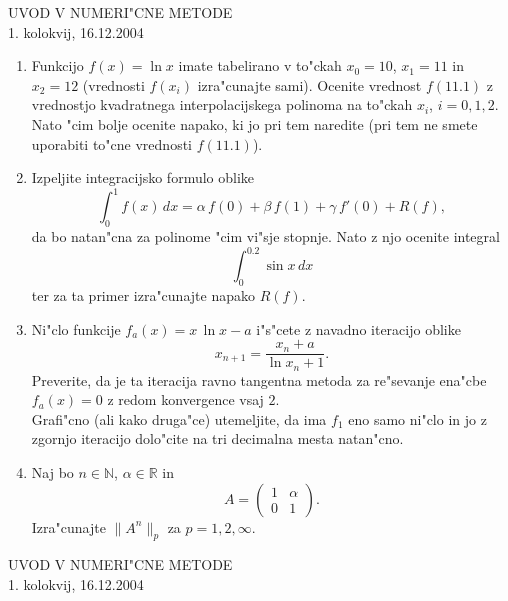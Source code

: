 \documentclass[12pt,a4paper]{article}
\def\RR{\mathbb{R}}
\def\NN{\mathbb{N}}
\begin{document}
\begin{center}
  {\large UVOD V NUMERI"CNE METODE\\
    1. kolokvij, 16.12.2004\\
    }
\end{center}
\vspace{2cm}

\begin{enumerate}

  \item Funkcijo $f(x)=\ln{x}$ imate tabelirano v 
    to"ckah $x_0=10$, $x_1=11$ in $x_2=12$ (vrednosti 
    $f(x_i)$ izra"cunajte sami). Ocenite vrednost $f(11.1)$
    z vrednostjo kvadratnega interpolacijskega polinoma 
    na to"ckah $x_i$, $i=0,1,2$. Nato "cim bolje ocenite napako, ki jo
    pri tem naredite (pri tem ne smete uporabiti to"cne
    vrednosti $f(11.1)$).
    
  \item Izpeljite integracijsko formulo oblike
    $$\int_{0}^1 f(x)\,dx=\alpha\,f(0)+\beta\,f(1)+\gamma\,f'(0)+R(f),$$
    da bo natan"cna za polinome "cim vi"sje stopnje. Nato 
    z njo ocenite integral
    $$\int_{0}^{0.2}\sin{x}\,dx$$
    ter za ta primer izra"cunajte napako $R(f)$.
   
  \item Ni"clo funkcije $f_a(x)=x\,\ln{x}-a$ i"s"cete z navadno iteracijo
   oblike
   $$x_{n+1}=\frac{x_{n}+a}{\ln{x_n}+1}.$$
   Preverite, da je ta iteracija ravno tangentna metoda  za re"sevanje
   ena"cbe $f_a(x)=0$ z redom konvergence vsaj $2$.\\
   Grafi"cno (ali kako druga"ce) utemeljite, da ima $f_1$ eno samo
   ni"clo in jo z zgornjo iteracijo dolo"cite na tri decimalna mesta 
   natan"cno.
  
  \item Naj bo $n\in\NN$, $\alpha\in\RR$ in 
    $$A=\left(
      \begin{array}{cc}
        1 & \alpha \\
        0 & 1
      \end{array}\right).
    $$
    Izra"cunajte $\|A^n\|_p$ za $p=1,2,\infty$.
\end{enumerate}
\newpage
\begin{center}
  {\large UVOD V NUMERI"CNE METODE\\
    1. kolokvij, 16.12.2004\\
    }
\end{center}
\vspace{2cm}
\end{document}
